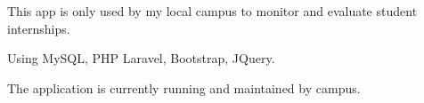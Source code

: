 \documentclass[letterpaper]{deedy-resume} %
\begin{document}
\begin{minipage}[t]{0.66\textwidth}

\begin{tightitemize}
\item This app is only used by my local campus to monitor and evaluate student internships.
\item Using MySQL, PHP Laravel, Bootstrap, JQuery.
\item The application is currently running and maintained by campus.
\end{tightitemize}
\sectionspace







\end{minipage} %
\end{document}
